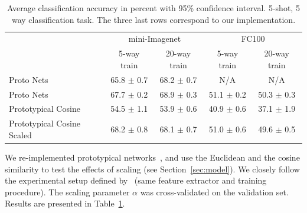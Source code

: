 \documentclass{article}
\begin{document}
\begin{table}[t]
    \centering
    \caption{Average classification accuracy in percent with 95\% confidence interval. 5-shot, 5 way classification task. The three last rows correspond to our implementation.}
    \label{table:cosine_vs_euclidian}
    \begin{tabular}{p{50mm} cccc} 
        \toprule
         & \multicolumn{2}{c}{mini-Imagenet}  & \multicolumn{2}{c}{FC100}  \\ 
         & 5-way train    &  20-way train   & 5-way train &  20-way train  \\ 
        \hline
        Proto Nets \cite{snell2017prototypical} & 65.8 $\pm$ 0.7 & 68.2 $\pm$ 0.7 & {N/A}  & {N/A}  \\
        \hline
        Proto Nets & 67.7 $\pm$ 0.2 & 68.9 $\pm$ 0.3 & 51.1 $\pm$ 0.2  & 50.3 $\pm$ 0.3  \\
        Prototypical Cosine & 54.5 $\pm$ 1.1   & 53.9 $\pm$ 0.6   & 40.9 $\pm$ 0.6   & 37.1 $\pm$ 1.9  \\ 
        Prototypical Cosine Scaled &  68.2 $\pm$ 0.8  & 68.1 $\pm$ 0.7  & 51.0 $\pm$ 0.6  & 49.6 $\pm$ 0.5   \\  
        \bottomrule
    \end{tabular}
\end{table}

We re-implemented prototypical networks~\citep{snell2017prototypical}, and use the Euclidean and the cosine similarity to test the effects of scaling (see Section~\ref{sec:model}). We closely follow the experimental setup defined by~\citet{snell2017prototypical} (same feature extractor and training procedure). The scaling parameter $\alpha$ was cross-validated on the validation set. Results are presented in Table~\ref{table:cosine_vs_euclidian}.
\end{document}
